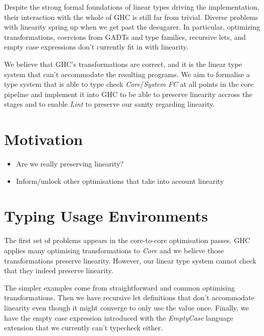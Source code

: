 \documentclass{article}
\begin{document}
Despite the strong formal foundations of linear types driving the
implementation, their interaction with the whole of GHC is still far from
trivial. Diverse problems with linearity spring up when we get past the
desugarer. In particular, optimizing transformations, coercions from GADTs and
type families, recursive lets, and empty case expressions don't currently fit in
with linearity.

We believe that GHC's transformations are correct, and it is the linear type
system that can't accommodate the resulting programs. We aim to formalise a type
system that is able to type check \emph{Core}/\emph{System FC} at all points in
the core pipeline and implement it into GHC to be able to preserve linearity
accross the stages and to enable \emph{Lint} to preserve our sanity regarding
linearity.

\section{Motivation}

\begin{itemize}
    \item Are we really preserving linearity?
    \item Inform/unlock other optimisations that take into account linearity
\end{itemize}


\section{Typing Usage Environments}

The first set of problems appears in the core-to-core optimisation passes. GHC
applies many optimising transformations to \emph{Core} and we believe those
transformations preserve linearity. However, our linear type system cannot check
that they indeed preserve linearity.

The simpler examples come from straightforward and common optimising
transformations. Then we have recursive let definitions that don't accommodate
linearity even though it might converge to only use the value once. Finally, we
have the empty case expression introduced with the \emph{EmptyCase} language
extension that we currently can't typecheck either.
\end{document}
